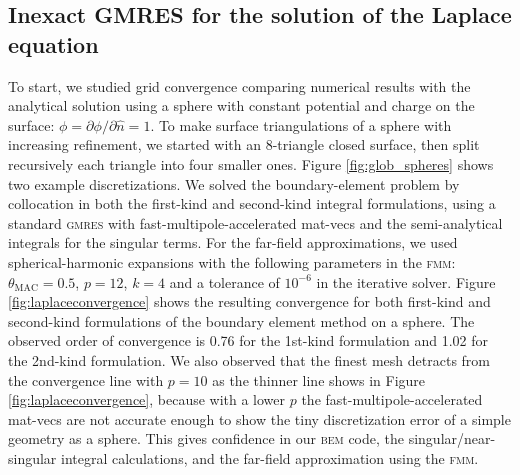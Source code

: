 \documentclass[final,3p,times]{elsarticle}
\newcommand{\bem}{\textsc{bem}\xspace}
\newcommand{\fmm}{\textsc{fmm}\xspace}
\newcommand{\gmres}{\textsc{gmres}\xspace}
\newcommand{\partialdi}[2]{\partial #1 / \partial #2}
\newcommand{\nhat}{\hat{n}}
\begin{document}
\subsection{Inexact {\small GMRES} for the solution of the Laplace equation}
\label{sec:inexactLaplace}
To start, we studied grid convergence comparing numerical results with the analytical solution using a sphere with constant potential and charge on the surface: $\phi = \partialdi{\phi}{\nhat} = 1$. To make surface triangulations of a sphere with increasing refinement, we started with an 8-triangle closed surface, then split recursively each triangle into four smaller ones. Figure \ref{fig:glob_spheres} shows two example discretizations. We solved the boundary-element problem by collocation in both the first-kind and second-kind integral formulations, using a standard \gmres with fast-multipole-accelerated mat-vecs and the semi-analytical integrals for the singular terms. For the far-field approximations, we used spherical-harmonic expansions with the following parameters in the \fmm: $\theta_{\text{MAC}} = 0.5$, $p = 12$, $k=4$ and a tolerance of $10^{-6}$ in the iterative solver. 
Figure \ref{fig:laplaceconvergence} shows the resulting convergence for both first-kind and second-kind formulations of the boundary element method on a sphere. The observed order of convergence is 0.76 for the 1st-kind formulation and 1.02 for the 2nd-kind formulation. We also observed that the finest mesh detracts from the convergence line with $p=10$ as the thinner line shows in Figure \ref{fig:laplaceconvergence}, because with a lower $p$ the fast-multipole-accelerated mat-vecs are not accurate enough to show the tiny discretization error of a simple geometry as a sphere. This gives confidence in our \bem code, the singular/near-singular integral calculations, and the far-field approximation using the \fmm.
\end{document}
